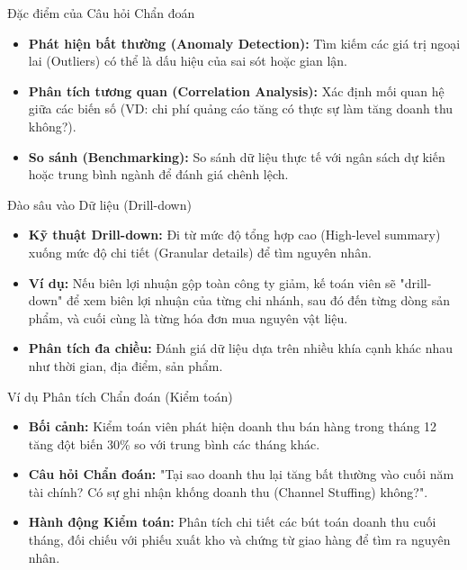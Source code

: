 \documentclass[aspectratio=169,12pt]{beamer}
\begin{document}
\begin{frame}{Đặc điểm của Câu hỏi Chẩn đoán}
\begin{itemize}
    \item \textbf{Phát hiện bất thường (Anomaly Detection):} Tìm kiếm các giá trị ngoại lai (Outliers) có thể là dấu hiệu của sai sót hoặc gian lận.
    \item \textbf{Phân tích tương quan (Correlation Analysis):} Xác định mối quan hệ giữa các biến số (VD: chi phí quảng cáo tăng có thực sự làm tăng doanh thu không?).
    \item \textbf{So sánh (Benchmarking):} So sánh dữ liệu thực tế với ngân sách dự kiến hoặc trung bình ngành để đánh giá chênh lệch.
\end{itemize}
\end{frame}

\begin{frame}{Đào sâu vào Dữ liệu (Drill-down)}
\begin{itemize}
    \item \textbf{Kỹ thuật Drill-down:} Đi từ mức độ tổng hợp cao (High-level summary) xuống mức độ chi tiết (Granular details) để tìm nguyên nhân.
    \item \textbf{Ví dụ:} Nếu biên lợi nhuận gộp toàn công ty giảm, kế toán viên sẽ "drill-down" để xem biên lợi nhuận của từng chi nhánh, sau đó đến từng dòng sản phẩm, và cuối cùng là từng hóa đơn mua nguyên vật liệu.
    \item \textbf{Phân tích đa chiều:} Đánh giá dữ liệu dựa trên nhiều khía cạnh khác nhau như thời gian, địa điểm, sản phẩm.
\end{itemize}
\end{frame}

\begin{frame}{Ví dụ Phân tích Chẩn đoán (Kiểm toán)}
\begin{itemize}
    \item \textbf{Bối cảnh:} Kiểm toán viên phát hiện doanh thu bán hàng trong tháng 12 tăng đột biến 30\% so với trung bình các tháng khác.
    \item \textbf{Câu hỏi Chẩn đoán:} "Tại sao doanh thu lại tăng bất thường vào cuối năm tài chính? Có sự ghi nhận khống doanh thu (Channel Stuffing) không?".
    \item \textbf{Hành động Kiểm toán:} Phân tích chi tiết các bút toán doanh thu cuối tháng, đối chiếu với phiếu xuất kho và chứng từ giao hàng để tìm ra nguyên nhân.
\end{itemize}
\end{frame}
\end{document}
